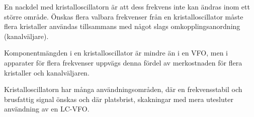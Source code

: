 En nackdel med kristalloscillatorn är att dess frekvens inte kan
ändras inom ett större område.
Önskas flera valbara frekvenser från en kristalloscillator måste flera
kristaller användas tillsammans med något slags omkopplingsanordning
(kanalväljare).

Komponentmängden i en kristalloscillator är mindre än i en VFO, men i
apparater för flera frekvenser uppvägs denna fördel av merkostnaden
för flera kristaller och kanalväljaren.

Kristalloscillatorn har många användningsområden, där en
frekvensstabil och brusfattig signal önskas och där platsbrist,
skakningar med mera utesluter användning av en LC-VFO.
